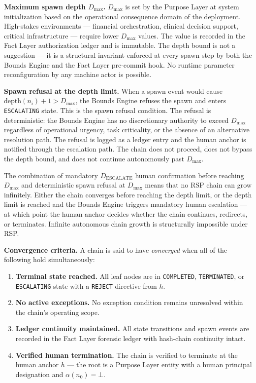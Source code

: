 \medskip
\noindent\textbf{Maximum spawn depth $D_{\max}$.} $D_{\max}$ is set by the Purpose Layer at system initialization based on the operational consequence domain of the deployment. High-stakes environments — financial orchestration, clinical decision support, critical infrastructure — require lower $D_{\max}$ values. The value is recorded in the Fact Layer authorization ledger and is immutable. The depth bound is not a suggestion — it is a structural invariant enforced at every spawn step by both the Bounds Engine and the Fact Layer pre-commit hook. No runtime parameter reconfiguration by any machine actor is possible.

\medskip
\noindent\textbf{Spawn refusal at the depth limit.} When a spawn event would cause $\text{depth}(n_i) + 1 > D_{\max}$, the Bounds Engine refuses the spawn and enters \texttt{ESCALATING} state. This is the spawn refusal condition. The refusal is deterministic: the Bounds Engine has no discretionary authority to exceed $D_{\max}$ regardless of operational urgency, task criticality, or the absence of an alternative resolution path. The refusal is logged as a ledger entry and the human anchor is notified through the escalation path. The chain does not proceed, does not bypass the depth bound, and does not continue autonomously past $D_{\max}$.

The combination of mandatory $D_{\text{ESCALATE}}$ human confirmation before reaching $D_{\max}$ and deterministic spawn refusal at $D_{\max}$ means that no RSP chain can grow infinitely. Either the chain converges before reaching the depth limit, or the depth limit is reached and the Bounds Engine triggers mandatory human escalation — at which point the human anchor decides whether the chain continues, redirects, or terminates. Infinite autonomous chain growth is structurally impossible under RSP.

\medskip
\noindent\textbf{Convergence criteria.} A chain is said to have \emph{converged} when all of the following hold simultaneously:

\begin{enumerate}
    \item[(C1)] \textbf{Terminal state reached.} All leaf nodes are in \texttt{COMPLETED}, \texttt{TERMINATED}, or \texttt{ESCALATING} state with a \texttt{REJECT} directive from $h$.
    \item[(C2)] \textbf{No active exceptions.} No exception condition remains unresolved within the chain's operating scope.
    \item[(C3)] \textbf{Ledger continuity maintained.} All state transitions and spawn events are recorded in the Fact Layer forensic ledger with hash-chain continuity intact.
    \item[(C4)] \textbf{Verified human termination.} The chain is verified to terminate at the human anchor $h$ — the root is a Purpose Layer entity with a human principal designation and $\alpha(n_0) = \bot$.
\end{enumerate}

